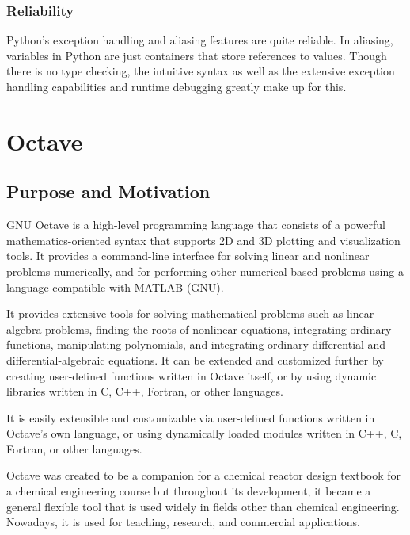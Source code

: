 \documentclass{article}
\begin{document}
\subsubsection*{Reliability}
\par
Python’s exception handling and aliasing features are quite reliable. In aliasing,  variables in Python are just containers that store references to values. Though there is no type checking, the intuitive syntax as well as the extensive exception handling capabilities and runtime debugging greatly make up for this.

\section*{Octave}

\subsection*{Purpose and Motivation}
\par
GNU Octave is a high-level programming language that consists of a powerful mathematics-oriented syntax that supports 2D and 3D plotting and visualization tools. It provides a command-line interface for solving linear and nonlinear problems numerically, and for performing other numerical-based problems using a language compatible with MATLAB (GNU).
\par
It provides extensive tools for solving mathematical problems such as linear algebra problems, finding the roots of nonlinear equations, integrating ordinary functions, manipulating polynomials, and integrating ordinary differential and differential-algebraic equations. It can be extended and customized further by creating user-defined functions written in Octave itself, or by using dynamic libraries written in C, C++, Fortran, or other languages.
\par
It is easily extensible and customizable via user-defined functions written in Octave’s own language, or using dynamically loaded modules written in C++, C, Fortran, or other languages.
\par
Octave was created to be a companion for a chemical reactor design textbook for a chemical engineering course but throughout its development, it became a general flexible tool that is used widely in fields other than chemical engineering. Nowadays, it is used for teaching, research, and commercial applications.
\end{document}
